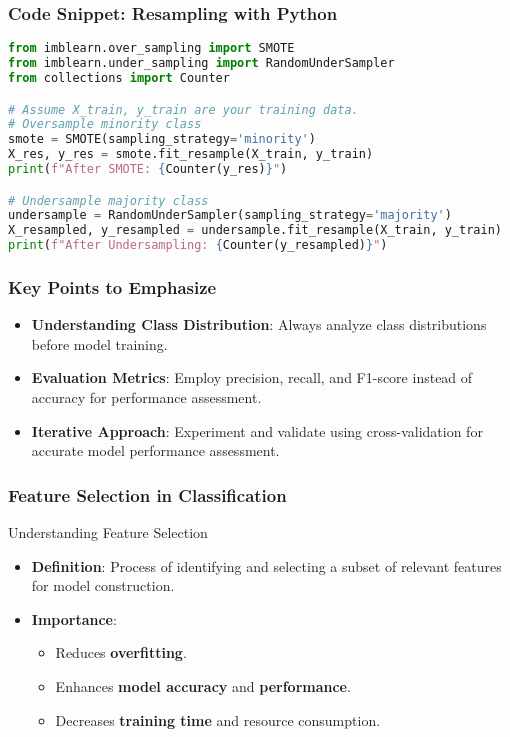 \documentclass[aspectratio=169]{beamer}
\begin{document}
\begin{frame}[fragile]
    \frametitle{Code Snippet: Resampling with Python}
    \begin{lstlisting}[language=Python]
from imblearn.over_sampling import SMOTE
from imblearn.under_sampling import RandomUnderSampler
from collections import Counter

# Assume X_train, y_train are your training data.
# Oversample minority class
smote = SMOTE(sampling_strategy='minority')
X_res, y_res = smote.fit_resample(X_train, y_train)
print(f"After SMOTE: {Counter(y_res)}")

# Undersample majority class
undersample = RandomUnderSampler(sampling_strategy='majority')
X_resampled, y_resampled = undersample.fit_resample(X_train, y_train)
print(f"After Undersampling: {Counter(y_resampled)}")
    \end{lstlisting}
\end{frame}

\begin{frame}[fragile]
    \frametitle{Key Points to Emphasize}
    \begin{itemize}
        \item \textbf{Understanding Class Distribution}: Always analyze class distributions before model training.
        \item \textbf{Evaluation Metrics}: Employ precision, recall, and F1-score instead of accuracy for performance assessment.
        \item \textbf{Iterative Approach}: Experiment and validate using cross-validation for accurate model performance assessment.
    \end{itemize}
\end{frame}

\begin{frame}[fragile]
    \frametitle{Feature Selection in Classification}
    \begin{block}{Understanding Feature Selection}
        \begin{itemize}
            \item \textbf{Definition}: Process of identifying and selecting a subset of relevant features for model construction.
            \item \textbf{Importance}:
                \begin{itemize}
                    \item Reduces \textbf{overfitting}.
                    \item Enhances \textbf{model accuracy} and \textbf{performance}.
                    \item Decreases \textbf{training time} and resource consumption.
                \end{itemize}
        \end{itemize}
    \end{block}
\end{frame}
\end{document}
